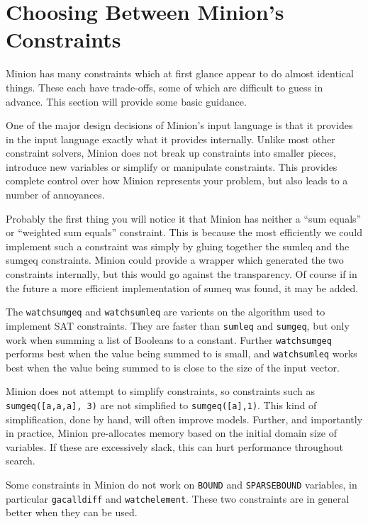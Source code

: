 \documentclass[oneside]{book}
\begin{document}
\section{Choosing Between Minion's Constraints}

Minion has many constraints which at first glance appear to do almost identical things. These each have trade-offs, some of which are difficult to guess in advance. This section will provide some basic guidance.

One of the major design decisions of Minion's input language is that it provides in the input language exactly what it provides internally. Unlike most other constraint solvers, Minion does not break up constraints into smaller pieces, introduce new variables or simplify or manipulate constraints. This provides complete control over how Minion represents your problem, but also leads to a number of annoyances.

Probably the first thing you will notice it that Minion has neither a ``sum equals'' or ``weighted sum equals'' constraint. This is because the most efficiently we could implement such a constraint was simply by gluing together the sumleq and the sumgeq constraints. Minion could provide a wrapper which generated the two constraints internally, but this would go against the transparency. Of course if in the future a more efficient implementation of sumeq was found, it may be added.

The \texttt{watchsumgeq} and \texttt{watchsumleq} are varients on the algorithm used to implement SAT constraints. They are faster than \texttt{sumleq} and \texttt{sumgeq}, but only work when summing a list of Booleans to a constant. Further \texttt{watchsumgeq} performs best when the value being summed to is small, and \texttt{watchsumleq} works best when the value being summed to is close to the size of the input vector.

Minion does not attempt to simplify constraints, so constraints such as \texttt{sumgeq([a,a,a], 3)} are not simplified to \texttt{sumgeq([a],1)}. This kind of simplification, done by hand, will often improve models. Further, and importantly in practice, Minion pre-allocates memory based on the initial domain size of variables. If these are excessively slack, this can hurt performance throughout search.

Some constraints in Minion do not work on \texttt{BOUND} and \texttt{SPARSEBOUND} variables, in particular \texttt{gacalldiff} and \texttt{watchelement}. These two constraints are in general better when they can be used.
\end{document}
